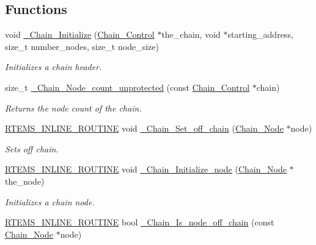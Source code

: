 \subsection*{Functions}
\begin{DoxyCompactItemize}
\item 
void \mbox{\hyperlink{group__RTEMSScoreChain_ga59b0dbda01fc9f0675bef62722627764}{\+\_\+\+Chain\+\_\+\+Initialize}} (\mbox{\hyperlink{unionChain__Control}{Chain\+\_\+\+Control}} $\ast$the\+\_\+chain, void $\ast$starting\+\_\+address, size\+\_\+t number\+\_\+nodes, size\+\_\+t node\+\_\+size)
\begin{DoxyCompactList}\small\item\em Initializes a chain header. \end{DoxyCompactList}\item 
size\+\_\+t \mbox{\hyperlink{group__RTEMSScoreChain_ga4daa9900dfef1496e71d41a5377ed645}{\+\_\+\+Chain\+\_\+\+Node\+\_\+count\+\_\+unprotected}} (const \mbox{\hyperlink{unionChain__Control}{Chain\+\_\+\+Control}} $\ast$chain)
\begin{DoxyCompactList}\small\item\em Returns the node count of the chain. \end{DoxyCompactList}\item 
\mbox{\hyperlink{group__RTEMSScoreBaseDefs_gac216239df231d5dbd15e3520b0b9313f}{R\+T\+E\+M\+S\+\_\+\+I\+N\+L\+I\+N\+E\+\_\+\+R\+O\+U\+T\+I\+NE}} void \mbox{\hyperlink{group__RTEMSScoreChain_gadf0e5d55d133694eed8043ec13fe1266}{\+\_\+\+Chain\+\_\+\+Set\+\_\+off\+\_\+chain}} (\mbox{\hyperlink{group__RTEMSScoreChain_ga0dd4bfcca1ac7f90de2842e447846d3d}{Chain\+\_\+\+Node}} $\ast$node)
\begin{DoxyCompactList}\small\item\em Sets off chain. \end{DoxyCompactList}\item 
\mbox{\hyperlink{group__RTEMSScoreBaseDefs_gac216239df231d5dbd15e3520b0b9313f}{R\+T\+E\+M\+S\+\_\+\+I\+N\+L\+I\+N\+E\+\_\+\+R\+O\+U\+T\+I\+NE}} void \mbox{\hyperlink{group__RTEMSScoreChain_gab0fa19f01d37f1d510405e6382fd8b67}{\+\_\+\+Chain\+\_\+\+Initialize\+\_\+node}} (\mbox{\hyperlink{group__RTEMSScoreChain_ga0dd4bfcca1ac7f90de2842e447846d3d}{Chain\+\_\+\+Node}} $\ast$the\+\_\+node)
\begin{DoxyCompactList}\small\item\em Initializes a chain node. \end{DoxyCompactList}\item 
\mbox{\hyperlink{group__RTEMSScoreBaseDefs_gac216239df231d5dbd15e3520b0b9313f}{R\+T\+E\+M\+S\+\_\+\+I\+N\+L\+I\+N\+E\+\_\+\+R\+O\+U\+T\+I\+NE}} bool \mbox{\hyperlink{group__RTEMSScoreChain_gad7a790f247b3ace45f039c60c18f999f}{\+\_\+\+Chain\+\_\+\+Is\+\_\+node\+\_\+off\+\_\+chain}} (const \mbox{\hyperlink{group__RTEMSScoreChain_ga0dd4bfcca1ac7f90de2842e447846d3d}{Chain\+\_\+\+Node}} $\ast$node)

\end{DoxyCompactItemize}
